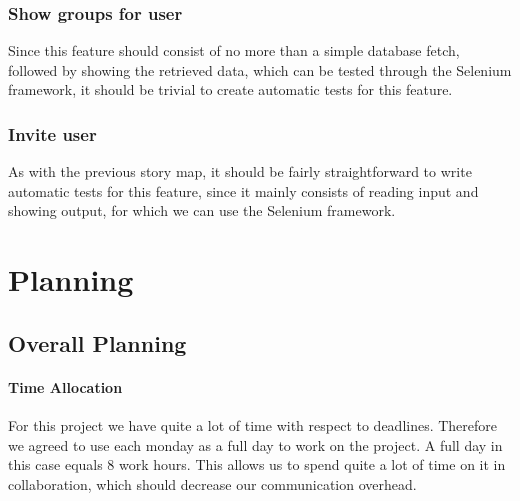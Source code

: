 \documentclass[10pt,a4paper,BCOR12mm, headexclude, footexclude,
  twoside, openright]{scrartcl}
\numberwithin{equation}{section} %
\numberwithin{figure}{section} %
\numberwithin{table}{section} %
\begin{document}
\subsubsection*{Show groups for user}
Since this feature should consist of no more than a simple database fetch,
followed by showing the retrieved data, which can be tested through the Selenium
framework, it should be trivial to create automatic tests for this feature.

\subsubsection*{Invite user}
As with the previous story map, it should be fairly straightforward to write
automatic tests for this feature, since it mainly consists of reading input and
showing output, for which we can use the Selenium framework.


\newpage
\section{Planning}
\subsection{Overall Planning}
\paragraph{Time Allocation}
For this project we have quite a lot of time with respect to
deadlines. Therefore we agreed to use each monday as a full
day to work on the project. A full day in this case equals 8 work hours. This
allows us to spend quite a lot of time on it in collaboration, which should decrease our communication overhead.
\end{document}
